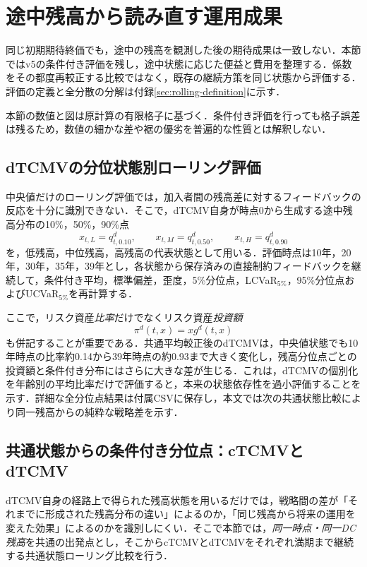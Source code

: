 \documentclass[10pt,a4paper]{article}
\theoremstyle{plain}
\theoremstyle{definition}
\begin{document}
\section{途中残高から読み直す運用成果}\label{sec:rolling-main}
同じ初期期待終価でも，途中の残高を観測した後の期待成果は一致しない．本節ではv5の条件付き評価を残し，途中状態に応じた便益と費用を整理する．係数をその都度再較正する比較ではなく，既存の継続方策を同じ状態から評価する．評価の定義と全分散の分解は付録\ref{sec:rolling-definition}に示す．

本節の数値と図は原計算の有限格子に基づく．条件付き評価を行っても格子誤差は残るため，数値の細かな差や裾の優劣を普遍的な性質とは解釈しない．
\subsection{dTCMVの分位状態別ローリング評価}
\label{sec:dtcmv-rolling-quantiles}

中央値だけのローリング評価では，加入者間の残高差に対するフィードバックの反応を十分に識別できない．そこで，dTCMV自身が時点0から生成する途中残高分布の10\%，50\%，90\%点
\[
  x_{t,L}=q_{t,0.10}^{d},\qquad
  x_{t,M}=q_{t,0.50}^{d},\qquad
  x_{t,H}=q_{t,0.90}^{d}
\]
を，低残高，中位残高，高残高の代表状態として用いる．評価時点は10年，20年，30年，35年，39年とし，各状態から保存済みの直接制約フィードバックを継続して，条件付き平均，標準偏差，歪度，5\%分位点，LCVaR$_{5\%}$，95\%分位点およびUCVaR$_{5\%}$を再計算する．

ここで，リスク資産\emph{比率}だけでなくリスク資産\emph{投資額}
\[
  \pi^d(t,x)=x g^d(t,x)
\]
も併記することが重要である．共通平均較正後のdTCMVは，中央値状態でも10年時点の比率約0.14から39年時点の約0.93まで大きく変化し，残高分位点ごとの投資額と条件付き分布にはさらに大きな差が生じる．これは，dTCMVの個別化を年齢別の平均比率だけで評価すると，本来の状態依存性を過小評価することを示す．詳細な全分位点結果は付属CSVに保存し，本文では次の共通状態比較により同一残高からの純粋な戦略差を示す．

\subsection{共通状態からの条件付き分位点：cTCMVとdTCMV}
\label{sec:dtcmv-common-state}

dTCMV自身の経路上で得られた残高状態を用いるだけでは，戦略間の差が「それまでに形成された残高分布の違い」によるのか，「同じ残高から将来の運用を変えた効果」によるのかを識別しにくい．そこで本節では，\emph{同一時点・同一DC残高}を共通の出発点とし，そこからcTCMVとdTCMVをそれぞれ満期まで継続する共通状態ローリング比較を行う．
\end{document}
